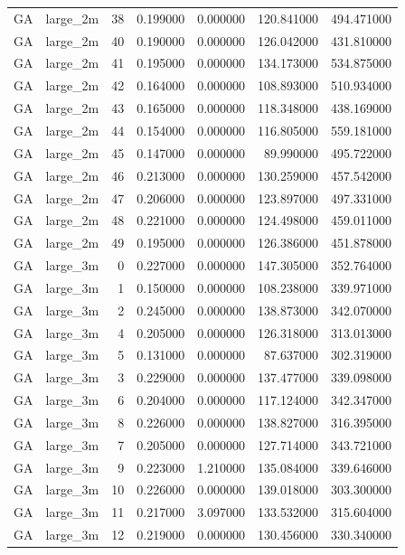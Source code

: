 \begin{tabular}{llrrrrr}
GA & large_2m & 38 & 0.199000 & 0.000000 & 120.841000 & 494.471000 \\
GA & large_2m & 40 & 0.190000 & 0.000000 & 126.042000 & 431.810000 \\
GA & large_2m & 41 & 0.195000 & 0.000000 & 134.173000 & 534.875000 \\
GA & large_2m & 42 & 0.164000 & 0.000000 & 108.893000 & 510.934000 \\
GA & large_2m & 43 & 0.165000 & 0.000000 & 118.348000 & 438.169000 \\
GA & large_2m & 44 & 0.154000 & 0.000000 & 116.805000 & 559.181000 \\
GA & large_2m & 45 & 0.147000 & 0.000000 & 89.990000 & 495.722000 \\
GA & large_2m & 46 & 0.213000 & 0.000000 & 130.259000 & 457.542000 \\
GA & large_2m & 47 & 0.206000 & 0.000000 & 123.897000 & 497.331000 \\
GA & large_2m & 48 & 0.221000 & 0.000000 & 124.498000 & 459.011000 \\
GA & large_2m & 49 & 0.195000 & 0.000000 & 126.386000 & 451.878000 \\
GA & large_3m & 0 & 0.227000 & 0.000000 & 147.305000 & 352.764000 \\
GA & large_3m & 1 & 0.150000 & 0.000000 & 108.238000 & 339.971000 \\
GA & large_3m & 2 & 0.245000 & 0.000000 & 138.873000 & 342.070000 \\
GA & large_3m & 4 & 0.205000 & 0.000000 & 126.318000 & 313.013000 \\
GA & large_3m & 5 & 0.131000 & 0.000000 & 87.637000 & 302.319000 \\
GA & large_3m & 3 & 0.229000 & 0.000000 & 137.477000 & 339.098000 \\
GA & large_3m & 6 & 0.204000 & 0.000000 & 117.124000 & 342.347000 \\
GA & large_3m & 8 & 0.226000 & 0.000000 & 138.827000 & 316.395000 \\
GA & large_3m & 7 & 0.205000 & 0.000000 & 127.714000 & 343.721000 \\
GA & large_3m & 9 & 0.223000 & 1.210000 & 135.084000 & 339.646000 \\
GA & large_3m & 10 & 0.226000 & 0.000000 & 139.018000 & 303.300000 \\
GA & large_3m & 11 & 0.217000 & 3.097000 & 133.532000 & 315.604000 \\
GA & large_3m & 12 & 0.219000 & 0.000000 & 130.456000 & 330.340000 \\

\end{tabular}

